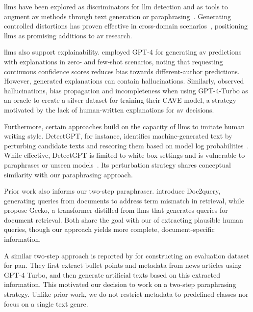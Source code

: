 \acp{llm} have been explored as discriminators for \ac{llm} detection \citep{futrzynski_pairwise_2021} and as tools to augment \ac{av} methods through text generation or paraphrasing~\citep{mao_raidar_2024,baradia_mirror_2025}. 
Generating controlled distortions has proven effective in cross-domain scenarios~\citep{bischoff_importance_2020}, positioning \acp{llm} as promising additions to \ac{av} research.

\acp{llm} also support explainability. 
\citet{hung_xai_av_llm_2023} employed GPT-4 for generating \ac{av} predictions with explanations in zero- and few-shot scenarios, noting that requesting continuous confidence scores reduces bias towards different-author predictions. 
However, generated explanations can contain hallucinations. 
Similarly, \citet{ramnath_cave_xai_llm_2025} observed hallucinations, bias propagation and incompleteness when using GPT-4-Turbo as an oracle to create a silver dataset for training their CAVE model, a strategy motivated by the lack of human-written explanations for \ac{av} decisions.

Furthermore, certain approaches build on the capacity of \acp{llm} to imitate human writing style.
DetectGPT, for instance, identifies machine-generated text by perturbing candidate texts and rescoring them based on model log probabilities~\citep{mitchell_detectgpt_2023}. 
While effective, DetectGPT is limited to white-box settings and is vulnerable to paraphrases or unseen models~\citep{Wu_ODD_challenges_2025}. 
Its perturbation strategy shares conceptual similarity with our paraphrasing approach.

Prior work also informs our two-step paraphraser. 
\citet{nogueira_doc2query_2019} introduce Doc2query, generating queries from documents to address term mismatch in retrieval, while \citet{lee_gecko_2024} propose Gecko, a transformer distilled from \acp{llm} that generates queries for document retrieval. 
Both share the goal with our \pextractor{} of extracting plausible human queries, though our approach yields more complete, document-specific information.

A similar two-step approach is reported by \citet{bevendorff_overview_2024} for constructing an evaluation dataset for \acs{pan}.
They first extract bullet points and metadata from news articles using GPT-4 Turbo, and then generate artificial texts based on this extracted information. 
This motivated our decision to work on a two-step paraphrasing strategy. 
Unlike prior work, we do not restrict metadata to predefined classes nor focus on a single text genre.

